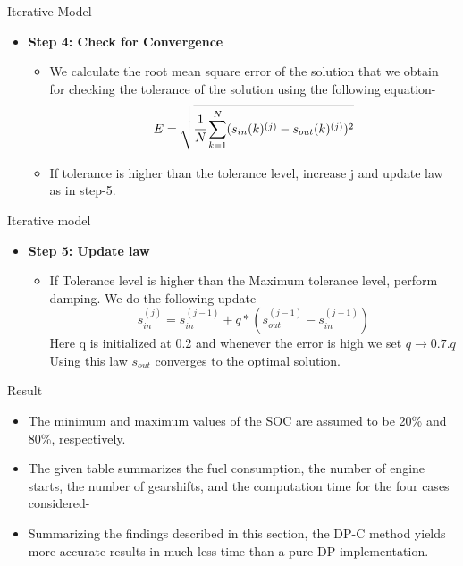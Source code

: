 \documentclass{beamer}
\begin{document}
\begin{frame}{Iterative Model}
    \begin{itemize}
        \item\textbf{Step 4: Check for Convergence}\\
        \begin{itemize}
            \item  We calculate the root mean square error of the solution that we obtain for checking the tolerance of the solution using the following equation-
            \begin{equation*}
                E = \sqrt{\cfrac{1}{N}\sum_{k=1}^{N}(s_{in}(k)^{(j)} - s_{out}(k)^{(j)})^2}
            \end{equation*}
            \item If tolerance is higher than the tolerance level, increase j and update law as in step-5.
        \end{itemize}
    \end{itemize}
    

\end{frame}

\begin{frame}{Iterative model}
\begin{itemize}
    \item\textbf{Step 5: Update law}\\
    \begin{itemize}
        \item If Tolerance level is higher than the Maximum tolerance level, perform damping. We do the following update-
        \begin{equation*}
            s_{in}^{(j)} = s_{in}^{(j-1)} + q*(s_{out}^{(j-1)} - s_{in}^{(j-1)})
        \end{equation*}
        Here q is initialized at 0.2 and whenever the error is high we set $q \rightarrow 0.7.q$\\
        Using this law $s_{out}$ converges to the optimal solution.
        
    \end{itemize}
    
\end{itemize}
    
\end{frame}

\begin{frame}{Result}
    \begin{itemize}
        \item The minimum and maximum values of the SOC are assumed to be 20\% and 80\%, respectively.
        \item The given table summarizes the fuel consumption, the number of engine starts, the number of gearshifts, and the 
        computation time for the four cases considered-


        \item Summarizing the findings described in this section, the DP-C method yields more accurate results in much less time than a pure DP implementation.
    \end{itemize}
\end{frame}
\end{document}
